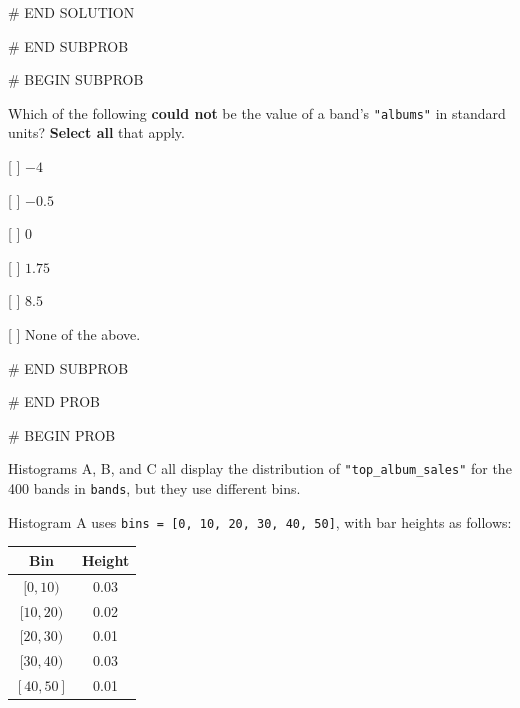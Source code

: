\documentclass[twoside,12pt]{article}
\begin{document}
{# END SOLUTION



# END SUBPROB

\bigskip

# BEGIN SUBPROB


Which of the following \textbf{could not} be the value of a band's \texttt{"albums"} in standard units? \textbf{Select all} that apply.

\medskip

[ ] $-4$

\smallskip

[ ] $-0.5$

\smallskip

[ ] $0$

\smallskip

[ ] $1.75$

\smallskip

[ ] $8.5$

\smallskip

[ ] None of the above.


# END SUBPROB





# END PROB


\newpage

# BEGIN PROB


Histograms A, B, and C all display the distribution of \texttt{"top\_album\_sales"} for the 400 bands in \texttt{bands}, but they use different bins.

\smallskip

Histogram A uses \texttt{bins = [0, 10, 20, 30, 40, 50]}, with bar heights as follows:

\smallskip

\begin{center}
\renewcommand{\arraystretch}{1.5}
\begin{tabular}{cc}
\toprule
Bin & Height \\
\midrule
$[0, 10)$ & 0.03 \\
$[10, 20)$ & 0.02 \\
$[20, 30)$ & 0.01 \\
$[30, 40)$ & 0.03 \\
$[40, 50]$ & 0.01 \\
\bottomrule
\end{tabular}
\end{center}

\smallskip





}
\end{document}
